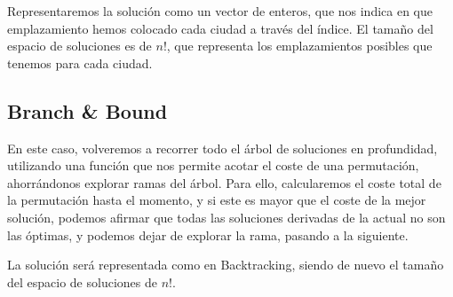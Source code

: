 \documentclass[a4paper, 11pt]{article} %
\begin{document}
	Representaremos la solución como un vector de enteros, que nos indica en que emplazamiento hemos colocado cada ciudad a 
	través del índice. El tamaño del espacio de soluciones es de $n!$, que representa los emplazamientos posibles que tenemos 
	para cada ciudad. 
      
      \subsection{Branch \& Bound}
	En este caso, volveremos a recorrer todo el árbol de soluciones en profundidad, utilizando una función que nos permite acotar el
	coste de una permutación, ahorrándonos explorar ramas del árbol. Para ello, calcularemos el coste total de la permutación hasta el 
	momento, y si este es mayor que el coste de la mejor solución, podemos afirmar que todas las soluciones derivadas de la actual no 
	son las óptimas, y podemos dejar de explorar la rama, pasando a la siguiente. 
	
	La solución será representada como en Backtracking, siendo de nuevo el tamaño del espacio de soluciones de $n!$.
\end{document}
